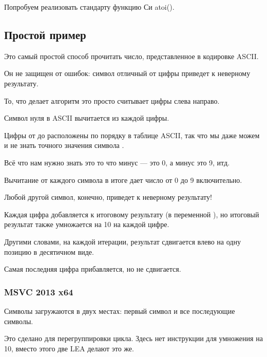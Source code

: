 
Попробуем реализовать стандарту функцию Си atoi().

\subsection{Простой пример}

Это самый простой способ прочитать число, представленное в кодировке \ac{ASCII}.

Он не защищен от ошибок: символ отличный от цифры приведет к неверному результату.



То, что делает алгоритм это просто считывает цифры слева направо.

Символ нуля в \ac{ASCII} вычитается из каждой цифры.

Цифры от  до  расположены по порядку в таблице \ac{ASCII}, так что мы даже можем
и не знать точного значения символа .

Всё что нам нужно знать это то что  минус  --- это 0, а  минус  это 9, итд.

Вычитание  от каждого символа в итоге дает число от 0 до 9 включительно.

Любой другой символ, конечно, приведет к неверному результату!

Каждая цифра добавляется к итоговому результату (в переменной ), но итоговый результат
также умножается на 10 на каждой цифре.

Другими словами, на каждой итерации, результат сдвигается влево на одну позицию в десятичном виде.

Самая последняя цифра прибавляется, но не сдвигается.

\subsubsection{\Optimizing MSVC 2013 x64}



Символы загружаются в двух местах: первый символ и все последующие символы.

Это сделано для перегруппировки цикла.
Здесь нет инструкции для умножения на 10, вместо этого две LEA делают это же.

